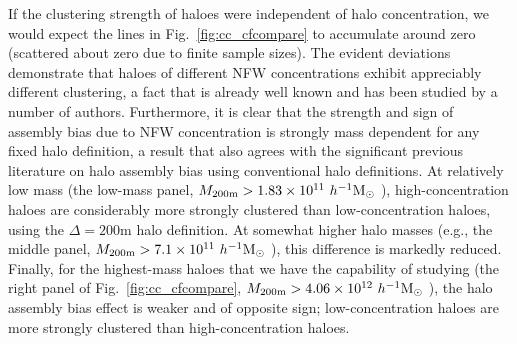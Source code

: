 \documentclass[usenatbib,fleqn]{mnras}
\begin{document}
If the clustering strength of haloes were independent of halo concentration, we would expect the lines in Fig.~\ref{fig:cc_cfcompare} to accumulate around zero (scattered about zero due to finite sample sizes). The evident deviations demonstrate that haloes of different NFW concentrations exhibit appreciably different clustering, a fact that is already well known and has been studied by a number of authors. Furthermore, it is clear that the strength and sign of assembly bias due to NFW concentration is 
strongly mass dependent for any fixed halo definition, a result that also agrees with the significant previous literature on halo assembly bias using conventional halo definitions.
At relatively low mass (the low-mass panel, $M_{200\text{m}} > 1.83 \times 10^{11} \ h^{-1}\mathrm{M}_{\odot}~$), high-concentration haloes are considerably more strongly clustered than low-concentration haloes, using the $\Delta = 200$m halo definition. At somewhat higher halo masses (e.g., the middle panel, $M_{200\text{m}} > 7.1 \times 10^{11} \ h^{-1}\mathrm{M}_{\odot}~$), this difference is markedly reduced. Finally, for the highest-mass haloes that we have the capability of studying (the right panel of Fig.~\ref{fig:cc_cfcompare}, $M_{200\text{m}} > 4.06 \times 10^{12} \ h^{-1}\mathrm{M}_{\odot}~$), the halo assembly bias effect is weaker and of opposite sign; low-concentration haloes are more strongly clustered than high-concentration haloes. 
\end{document}
